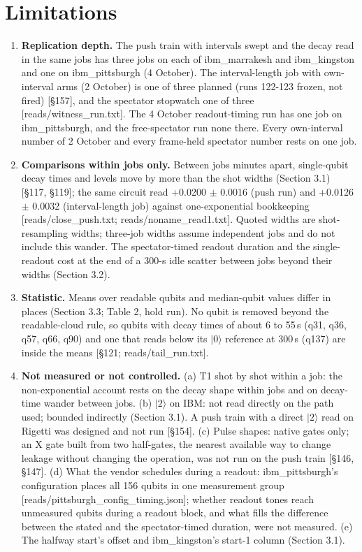 \documentclass[11pt]{article}
\begin{document}
\section{Limitations}
\begin{enumerate}
\item \textbf{Replication depth.} The push train with intervals swept and the decay read in the same jobs has three jobs on each of ibm\_marrakesh and ibm\_kingston and one on ibm\_pittsburgh (4 October). The interval-length job with own-interval arms (2 October) is one of three planned (runs 122-123 frozen, not fired) {[}\S{}157{]}, and the spectator stopwatch one of three {[}reads/witness\_run.txt{]}. The 4 October readout-timing run has one job on ibm\_pittsburgh, and the free-spectator run none there. Every own-interval number of 2 October and every frame-held spectator number rests on one job.
\item \textbf{Comparisons within jobs only.} Between jobs minutes apart, single-qubit decay times and levels move by more than the shot widths (Section 3.1) {[}\S{}117, \S{}119{]}; the same circuit read +0.0200 \(\pm\) 0.0016 (push run) and +0.0126 \(\pm\) 0.0032 (interval-length job) against one-exponential bookkeeping {[}reads/close\_push.txt; reads/noname\_read1.txt{]}. Quoted widths are shot-resampling widths; three-job widths assume independent jobs and do not include this wander. The spectator-timed readout duration and the single-readout cost at the end of a 300-\textmu s idle scatter between jobs beyond their widths (Section 3.2).
\item \textbf{Statistic.} Means over readable qubits and median-qubit values differ in places (Section 3.3; Table 2, hold run). No qubit is removed beyond the readable-cloud rule, so qubits with decay times of about 6 to 55\,\textmu s (q31, q36, q57, q66, q90) and one that reads below its \(|0\rangle\) reference at 300\,\textmu s (q137) are inside the means {[}\S{}121; reads/tail\_run.txt{]}.
\item \textbf{Not measured or not controlled.} (a) T1 shot by shot within a job: the non-exponential account rests on the decay shape within jobs and on decay-time wander between jobs. (b) \(|2\rangle\) on IBM: not read directly on the path used; bounded indirectly (Section 3.1). A push train with a direct \(|2\rangle\) read on Rigetti was designed and not run {[}\S{}154{]}. (c) Pulse shapes: native gates only; an X gate built from two half-gates, the nearest available way to change leakage without changing the operation, was not run on the push train {[}\S{}146, \S{}147{]}. (d) What the vendor schedules during a readout: ibm\_pittsburgh's configuration places all 156 qubits in one measurement group {[}reads/pittsburgh\_config\_timing.json{]}; whether readout tones reach unmeasured qubits during a readout block, and what fills the difference between the stated and the spectator-timed duration, were not measured. (e) The halfway start's offset and ibm\_kingston's start-1 column (Section 3.1).

\end{enumerate}
\end{document}

